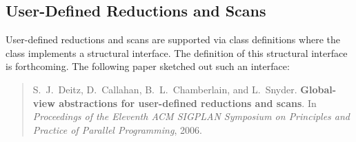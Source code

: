 \subsection{User-Defined Reductions and Scans}
\label{udr}

User-defined reductions and scans are supported via class definitions
where the class implements a structural interface.  The definition of
this structural interface is forthcoming.  The following paper
sketched out such an interface:
\begin{quote}
S.~J.~Deitz, D.~Callahan, B.~L.~Chamberlain, and L.~Snyder.  {\bf
Global-view abstractions for user-defined reductions and scans}.  In
{\it Proceedings of the Eleventh ACM SIGPLAN Symposium on Principles
and Practice of Parallel Programming}, 2006.
\end{quote}
